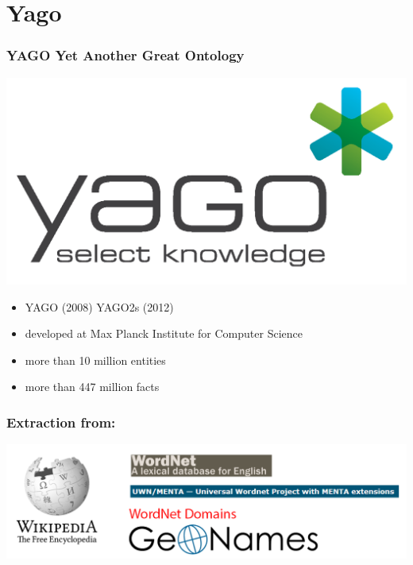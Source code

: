 

\section{Yago}
\begin{frame}
\frametitle{YAGO Yet Another Great Ontology}
\includegraphics[scale=0.25]{img/yago_logo_small.png}
\begin{itemize}
\item YAGO (2008) YAGO2s (2012)
\item developed at Max Planck Institute for Computer Science
\item more than 10 million entities
\item more than 447 million facts
\end{itemize}
\end{frame}

\begin{frame}
\frametitle{Extraction from:}
\includegraphics[scale=0.31]{img/yago-figure2.png}
\end{frame}


